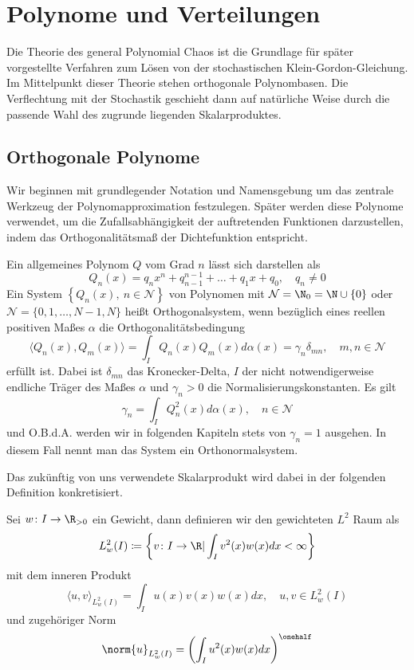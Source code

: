 \section{Polynome und Verteilungen}
Die Theorie des general Polynomial Chaos ist die Grundlage für später vorgestellte Verfahren zum Lösen von der stochastischen Klein-Gordon-Gleichung. Im Mittelpunkt dieser Theorie stehen orthogonale Polynombasen. Die Verflechtung mit der Stochastik geschieht dann auf natürliche Weise durch die passende Wahl des zugrunde liegenden Skalarproduktes.
\subsection{Orthogonale Polynome}
Wir beginnen mit grundlegender Notation und Namensgebung um das zentrale Werkzeug der Polynomapproximation festzulegen. Später werden diese Polynome verwendet, um die Zufallsabhängigkeit der auftretenden Funktionen darzustellen, indem das Orthogonalitätsmaß der Dichtefunktion entspricht.

\begin{mathdef}
Ein allgemeines Polynom $Q$ vom Grad $n$ lässt sich darstellen als
\[Q_n(x)=q_nx^n+q_{n-1}^{n-1}+\dots+q_1x+q_0,\quad q_n\ne 0\]
Ein System $\left\lbrace Q_n(x),\: n\in\mathcal{N}\right\rbrace$ von Polynomen mit $\mathcal{N}=\N_0=\N\cup\lbrace 0\rbrace$ oder $\mathcal{N}=\lbrace 0,1,\dots,N-1,N\rbrace$ heißt Orthogonalsystem, wenn bezüglich eines reellen positiven Maßes $\alpha$ die Orthogonalitätsbedingung
 \[\langle Q_n(x),Q_m(x)\rangle =\int_I Q_n(x)Q_m(x)d\alpha(x)=\gamma_n\delta_{mn},\quad m,n\in\mathcal{N}\]
 erfüllt ist. Dabei ist $\delta_{mn}$ das Kronecker-Delta, $I$ der nicht notwendigerweise endliche Träger des Maßes $\alpha$ und $\gamma_n>0$ die Normalisierungskonstanten. Es gilt 
 \[\gamma_n=\int_I Q_n^2(x)d\alpha(x),\quad n\in\mathcal{N}\] und O.B.d.A. werden wir in folgenden Kapiteln stets von $\gamma_n=1$ ausgehen. In diesem Fall nennt man das System ein Orthonormalsystem.
\end{mathdef}
Das zukünftig von uns verwendete Skalarprodukt wird dabei in der folgenden Definition konkretisiert.
\begin{mathdef}
Sei $w\colon I\to\R_{>0}$ ein Gewicht, dann definieren wir den gewichteten $L^2$ Raum als
\begin{equation*}
L_w^2(I)\coloneqq \left\lbrace v\colon I\to\R | \int_Iv^2(x)w(x)dx<\infty\right\rbrace
\end{equation*}
mit dem inneren Produkt 
\[\langle u,v\rangle_{L_w^2(I)}=\int_I u(x)v(x)w(x)dx,\quad u,v\in L_w^2(I)\]
und zugehöriger Norm
\[\norm{u}_{L_w^2(I)}=\left(\int_I u^2(x)w(x)dx\right)^{\onehalf}\]
\end{mathdef}

